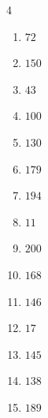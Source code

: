 \begin{multicols}{4}
\begin{enumerate}

  \item $72$


  \item $150$


  \item $43$


  \item $100$


  \item $130$


  \item $179$


\columnbreak %

\resetques

  \item $194$


  \item $11$


  \item $200$


  \item $168$


  \item $146$


  \item $17$


  \item $145$


  \item $138$


  \item $189$


\end{enumerate}
\end{multicols}
